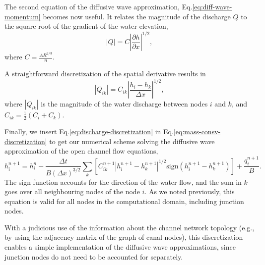\documentclass[bg, manuscript]{copernicus}
\begin{document}
The second equation of the diffusive wave approximation, Eq.\eqref{eq:diff-wave-momentum}  becomes now useful.
It relates the magnitude of the discharge $Q$ to the square root of the gradient of the water elevation,
\begin{equation} \label{}
|Q| = C\left|\frac{\partial h}{\partial x}\right|^{1/2},
\end{equation}
where $C=\frac{A R^{2/3}}{n}$.

A straightforward discretization of the spatial derivative results in 
\begin{equation} \label{eq:discharge-discretization}
|Q_{ik}| = C_{ik}\left|\frac{h_i - h_k}{\Delta x}\right|^{1/2},
\end{equation}
where $|Q_{ik}|$ is the magnitude of the water discharge between nodes $i$ and $k$, and $C_{ik} = \frac{1}{2}\left(C_i + C_k\right)$.

Finally, we insert Eq.\eqref{eq:discharge-discretization} in Eq.\eqref{eq:mass-consv-discretization} to get our numerical scheme solving the diffusive wave approximation of the open channel flow equations,
\begin{equation} \label{eq:openchannelflow-final-discretization}
h_i^{n+1} = h_i^n - \frac{\Delta t}{B(\Delta x)^{3/2}}\sum_k\left[C_{ik}^{n+1}|h_i^{n+1} - h_k^{n+1}|^{1/2} \text{sign}(h_i^{n+1} - h_k^{n+1})\right] + \frac{q_i^{n+1}}{B}.
\end{equation}
The sign function accounts for the direction of the water flow, and the sum in $k$ goes over all neighbouring nodes of the node $i$. 
As we noted previously, this equation is valid for all nodes in the computational domain, including junction nodes.

With a judicious use of the information about the channel network topology (e.g., by using the adjacency matrix of the graph of canal nodes), this discretization enables a simple implementation of the diffusive wave approximations, since junction nodes do not need to be accounted for separately.


\noappendix       %


\end{document}
